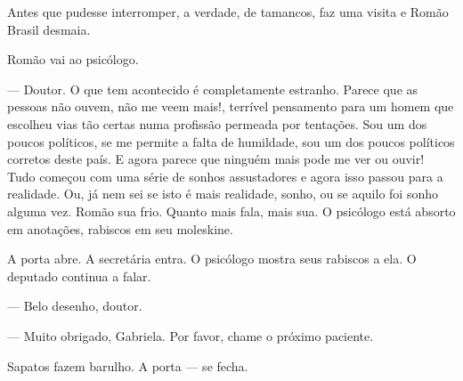 Antes que pudesse interromper, a verdade, de tamancos, faz uma visita e Romão Brasil desmaia.



Romão vai ao psicólogo.

--- Doutor. O que tem acontecido é completamente estranho. Parece que as pessoas não ouvem, não me veem mais!, terrível pensamento para um homem que escolheu vias tão certas numa profissão permeada por tentações. Sou um dos poucos políticos, se me permite a falta de humildade, sou um dos poucos políticos corretos deste país. E agora parece que ninguém mais pode me ver ou ouvir! Tudo começou com uma série de sonhos assustadores e agora isso passou para a realidade. Ou, já nem sei se isto é mais realidade, sonho, ou se aquilo foi sonho alguma vez. Romão sua frio. Quanto mais fala, mais sua. O psicólogo está absorto em anotações, rabiscos em seu moleskine.

A porta abre. A secretária entra. O psicólogo mostra seus rabiscos a ela. O deputado continua a falar.

--- Belo desenho, doutor.

--- Muito obrigado, Gabriela. Por favor, chame o próximo paciente.

Sapatos fazem barulho. A porta --- se fecha.
